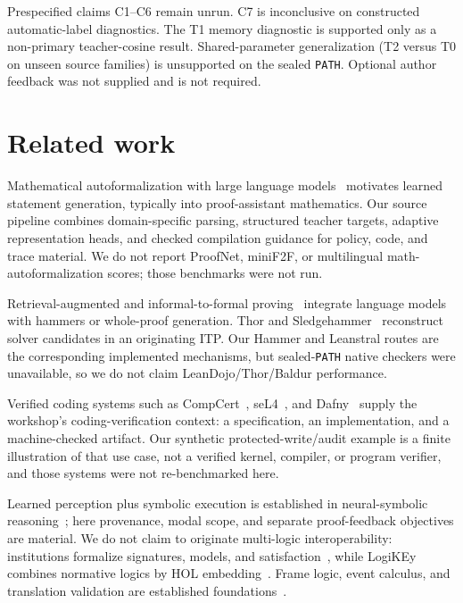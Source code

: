 \documentclass{article}
\begin{document}
Prespecified claims C1--C6 remain unrun. C7 is inconclusive on constructed automatic-label diagnostics. The T1 memory diagnostic is supported only as a non-primary teacher-cosine result. Shared-parameter generalization (T2 versus T0 on unseen source families) is unsupported on the sealed \texttt{PATH}. Optional author feedback was not supplied and is not required.

\section{Related work}
Mathematical autoformalization with large language models~\citep{wu2022autoformalization,azerbayev2023proofnet,jiang2024multilanguage} motivates learned statement generation, typically into proof-assistant mathematics. Our source pipeline combines domain-specific parsing, structured teacher targets, adaptive representation heads, and checked compilation guidance for policy, code, and trace material. We do not report ProofNet, miniF2F, or multilingual math-autoformalization scores; those benchmarks were not run.

Retrieval-augmented and informal-to-formal proving~\citep{jiang2022thor,jiang2023dsp,yang2023leandojo,first2023baldur} integrate language models with hammers or whole-proof generation. Thor and Sledgehammer~\citep{blanchette2013sledgehammer} reconstruct solver candidates in an originating ITP. Our Hammer and Leanstral routes are the corresponding implemented mechanisms, but sealed-\texttt{PATH} native checkers were unavailable, so we do not claim LeanDojo/Thor/Baldur performance.

Verified coding systems such as CompCert~\citep{leroy2009compcert}, seL4~\citep{klein2009sel4}, and Dafny~\citep{leino2010dafny} supply the workshop's coding-verification context: a specification, an implementation, and a machine-checked artifact. Our synthetic protected-write/audit example is a finite illustration of that use case, not a verified kernel, compiler, or program verifier, and those systems were not re-benchmarked here.

Learned perception plus symbolic execution is established in neural-symbolic reasoning~\citep{yi2018nsvqa}; here provenance, modal scope, and separate proof-feedback objectives are material. We do not claim to originate multi-logic interoperability: institutions formalize signatures, models, and satisfaction~\citep{goguen1992institutions}, while LogiKEy combines normative logics by HOL embedding~\citep{benzmuller2020logikey}. Frame logic, event calculus, and translation validation are established foundations~\citep{kifer1995flogic,kowalski1986events,pnueli1998translation}.
\end{document}
